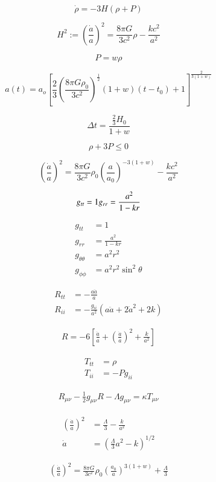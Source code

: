 $$
\dot{\rho} = -3H(\rho + P)
$$

$$
H^2:=\left(\frac{\dot{a}}{a}\right)^2=\frac{8\pi G}{3c^2}\rho - \frac{kc^2}{a^2}
$$

$$
P=w\rho
$$

$$
a(t) = a_o\left[\frac{2}{3}\left(\frac{8\pi G\rho_0}{3c^2}\right)^{\frac{1}{2}}\left(1+w\right)\left(t-t_0\right)+1\right]^{\frac{2}{3\left(1+w\right)}}
$$

$$
\Delta t = \frac{\frac{2}{3}H_0}{1+w}
$$

$$
\rho + 3P \leq 0
$$

$$
\left(\frac{\dot{a}}{a}\right)^2=\frac{8\pi G}{3c^2}\rho_0\left(\frac{a}{a_0}\right)^{-3(1+w)} - \frac{kc^2}{a^2}
$$

$$
g_{tt}=1\\
g_{rr}=\frac{a^2}{1-kr}\\
$$


\begin{align*}
    g_{tt}&=1\\
    g_{rr}&=\frac{a^2}{1-kr}\\
    g_{\theta\theta}&=a^2r^2\\
    g_{\phi\phi}&=a^2r^2\sin^2\theta
\end{align*}

\begin{align*}
    R_{tt}&=-\frac{a\ddot{a}}{a}\\
    R_{ii}&=-\frac{g_{ii}}{a^2}\left(a\ddot{a}+2\dot{a}^2+2k\right)
\end{align*}

\begin{align*}
    R = -6\left[\frac{\ddot{a}}{a}+\left(\frac{\dot{a}}{a}\right)^2+\frac{k}{a^2}\right]
\end{align*}

\begin{align*}
    T_{tt}&=\rho\\
    T_{ii}&=-Pg_{ii}
\end{align*}

\begin{align*}
    R_{\mu\nu}-\frac{1}{2}g_{\mu\nu}R-\Lambda g_{\mu\nu} = \kappa T_{\mu\nu}
\end{align*}

\begin{align*}
    \left(\frac{\dot{a}}{a}\right)^2&=\frac{\Lambda}{3}-\frac{k}{a^2}\\
    \dot{a}&=\left(\frac{\Lambda}{3}a^2-k\right)^{1/2}
\end{align*}

\begin{align*}
    \left(\frac{\dot{a}}{a}\right)^2=\frac{8\pi G}{3c^2}\rho_0\left(\frac{a_0}{a}\right)^{3(1+w)}+\frac{\Lambda}{3}
\end{align*}